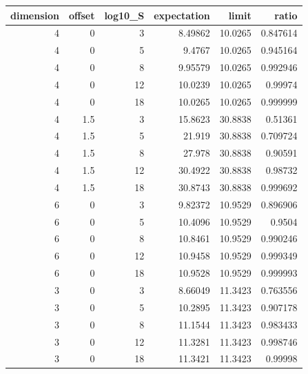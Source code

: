 \begin{tabular}{rrrrrr}
\toprule
dimension & offset & log10_S & expectation & limit & ratio \\
\midrule
4 & 0 & 3 & 8.49862 & 10.0265 & 0.847614 \\
4 & 0 & 5 & 9.4767 & 10.0265 & 0.945164 \\
4 & 0 & 8 & 9.95579 & 10.0265 & 0.992946 \\
4 & 0 & 12 & 10.0239 & 10.0265 & 0.99974 \\
4 & 0 & 18 & 10.0265 & 10.0265 & 0.999999 \\
4 & 1.5 & 3 & 15.8623 & 30.8838 & 0.51361 \\
4 & 1.5 & 5 & 21.919 & 30.8838 & 0.709724 \\
4 & 1.5 & 8 & 27.978 & 30.8838 & 0.90591 \\
4 & 1.5 & 12 & 30.4922 & 30.8838 & 0.98732 \\
4 & 1.5 & 18 & 30.8743 & 30.8838 & 0.999692 \\
6 & 0 & 3 & 9.82372 & 10.9529 & 0.896906 \\
6 & 0 & 5 & 10.4096 & 10.9529 & 0.9504 \\
6 & 0 & 8 & 10.8461 & 10.9529 & 0.990246 \\
6 & 0 & 12 & 10.9458 & 10.9529 & 0.999349 \\
6 & 0 & 18 & 10.9528 & 10.9529 & 0.999993 \\
3 & 0 & 3 & 8.66049 & 11.3423 & 0.763556 \\
3 & 0 & 5 & 10.2895 & 11.3423 & 0.907178 \\
3 & 0 & 8 & 11.1544 & 11.3423 & 0.983433 \\
3 & 0 & 12 & 11.3281 & 11.3423 & 0.998746 \\
3 & 0 & 18 & 11.3421 & 11.3423 & 0.99998 \\
\bottomrule
\end{tabular}
